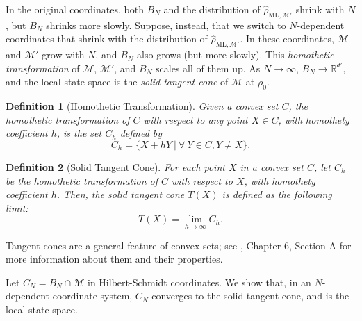 \documentclass[aps,pra, twocolumn]{revtex4-1}
\newcommand{\M}{\mathcal{M}}
\newcommand{\rhohat}{\hat{\rho}}
\newcommand{\rhoML}[1]{\rhohat_{\scriptscriptstyle{\mathrm{ML},#1}}}
\newtheorem{mydef}{Definition}
\begin{document}
In the original coordinates, both $B_{N}$ and the distribution of $\rhoML{\M'}$ shrink with $N$, but $B_N$ shrinks more slowly.  Suppose, instead, that we switch to $N$-dependent coordinates that shrink with the distribution of $\rhoML{\M'}$.  In these coordinates, $\M$ and $\M'$ grow with $N$, and $B_{N}$ also grows (but more slowly).  This  \emph{homothetic transformation} of $\M$, $\M'$, and $B_{N}$ scales all of them up.  As $N \rightarrow \infty$, $B_{N} \rightarrow \mathbb{R}^{d'}$,  and the local state space is the \emph{solid tangent cone} of $\M$ at $\rho_0$.

\begin{mydef}[Homothetic Transformation] Given a convex set $C$, the homothetic transformation of $C$ with respect to any point $X \in C$, with homothety coefficient $h$, is the set $C_{h}$ defined by
\[C_{h} = \{X + hY~|~\forall~Y\in C, Y \neq X\}.\]
\end{mydef}

\begin{mydef}[Solid Tangent Cone] For each point $X$ in a convex set $C$, let $C_{h}$ be the homothetic transformation of $C$ with respect to $X$, with homothety coefficient $h$. Then, the solid tangent cone $T(X)$ is defined as the following limit:
\[T(X) = \lim_{h\rightarrow \infty} C_{h}.\]
\end{mydef}

Tangent cones are a general feature of convex sets; see \cite{Rockafellar1998}, Chapter 6, Section A for more information about them and their properties.

Let $C_{N} = B_{N} \cap \M$ in Hilbert-Schmidt coordinates. 
We show that, in an $N$-dependent coordinate system, $C_{N}$ converges to the solid tangent cone, and is the local state space.
\end{document}
